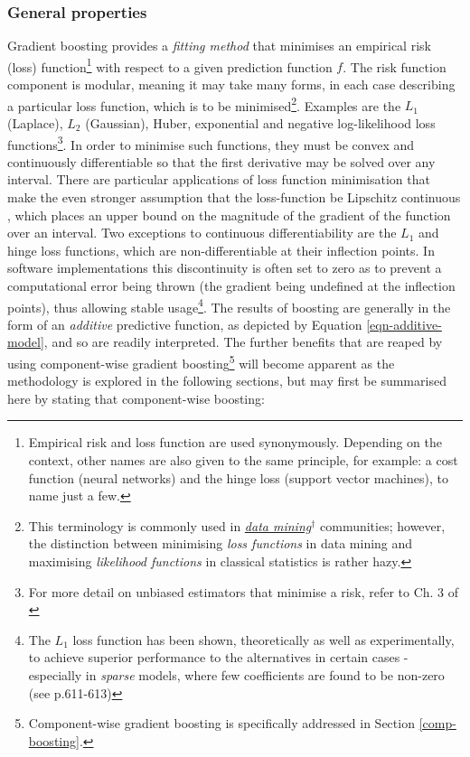 \documentclass{article}
\begin{document}
\subsubsection{General properties \label{gen-props}}
\label{sec-1-3-2}

Gradient boosting provides a \emph{fitting method} that minimises an empirical risk (loss) function\footnote{Empirical risk and loss function are used synonymously. Depending on the context, other names are also given to the same principle, for example: a cost function (neural networks) and the hinge loss (support vector machines), to name just a few.} with respect to a given prediction function $f$. The risk function component is modular, meaning it may take many forms, in each case describing a particular loss function, which is to be minimised\footnote{This terminology is commonly used in \href{https://en.wikipedia.org/wiki/Data_mining}{\emph{data mining$^{\dag{}}$}} communities; however, the distinction between minimising \emph{loss functions} in data mining and maximising \emph{likelihood functions} in classical statistics is rather hazy.}. Examples are the $L_1$ (Laplace), $L_2$ (Gaussian), Huber, exponential and negative log-likelihood loss functions\footnote{For more detail on unbiased estimators that minimise a risk, refer to Ch. 3 of \cite{pfanzagl1994parametric}}. In order to minimise such functions, they must be convex and continuously differentiable so that the first derivative may be solved over any interval. There are particular applications of loss function minimisation that make the even stronger assumption that the loss-function be Lipschitz continuous \cite{dimitrakakis2013differential}, which places an upper bound on the magnitude of the gradient of the function over an interval. Two exceptions to continuous differentiability are the $L_1$ and hinge loss functions, which are non-differentiable at their inflection points. In software implementations this discontinuity is often set to zero as to prevent a computational error being thrown (the gradient being undefined at the inflection points), thus allowing stable usage\footnote{The $L_1$ loss function has been shown, theoretically as well as experimentally, to achieve superior performance to the alternatives in certain cases - especially in \emph{sparse} models, where few coefficients are found to be non-zero (see \cite{Hastie2009} p.611-613)}.
The results of boosting are generally in the form of an \emph{additive} predictive function, as depicted by Equation \eqref{eqn-additive-model}, and so are readily interpreted. The further benefits that are reaped by using component-wise gradient boosting\footnote{Component-wise gradient boosting is specifically addressed in Section \ref{comp-boosting}.} will become apparent as the methodology is explored in the following sections, but may first be summarised here by stating that component-wise boosting:
\end{document}
